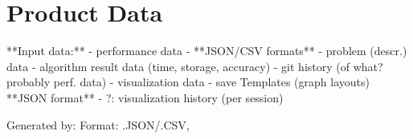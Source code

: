 \section{Product Data}

**Input data:**
- performance data
    - **JSON/CSV formats**
    - problem (descr.) data
    - algorithm result data (time, storage, accuracy)
- git history (of what? probably perf. data)
- \gls{visualization} data
    - save Templates (graph layouts) **JSON format**
    - ?: \gls{visualization} history (per session)
    
Generated by: 
Format: .JSON/.CSV, 


